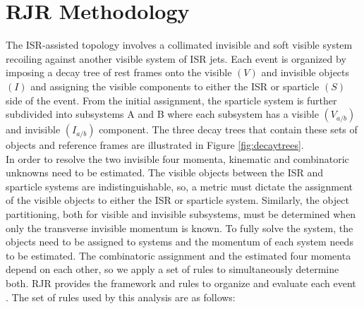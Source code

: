 \section{ RJR Methodology}
 The ISR-assisted topology involves a collimated invisible and soft visible system recoiling against another visible system of ISR jets. Each event is organized by imposing a decay tree of rest frames onto the visible $(V)$ and invisible objects $(I)$ and assigning the visible components to either the ISR or sparticle $(S)$ side of the event. From the initial assignment, the sparticle system is further subdivided into subsystems A and B where each subsystem has a visible $(V_{a/b})$ and invisible  $(I_{a/b})$ component. The three decay trees that contain these sets of objects and reference frames are illustrated in Figure \ref{fig:decaytrees}. \\
In order to resolve the two invisible four momenta, kinematic and combinatoric unknowns need to be estimated. The visible objects between the ISR and sparticle systems are indistinguishable, so, a metric must dictate the assignment of the visible objects to either the ISR or sparticle system. Similarly, the object partitioning, both for visible and invisible subsystems, must be determined when only the transverse invisible momentum is known. To fully solve the system, the objects need to be assigned to systems and the momentum of each system needs to be estimated. The combinatoric assignment and the estimated four momenta depend on each other, so we  apply a set of rules to simultaneously determine both.  RJR provides the framework and rules to organize and evaluate each event \cite{PhysRevD.96.112007}. The set of rules used by this analysis are as follows:
